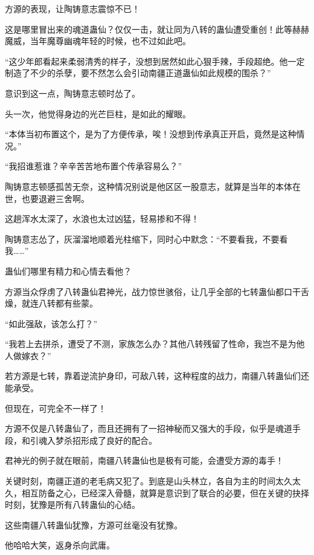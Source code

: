 
\begin{this_body}



方源的表现，让陶铸意志震惊不已！

这是哪里冒出来的魂道蛊仙？仅仅一击，就让同为八转的蛊仙遭受重创！此等赫赫魔威，当年魔尊幽魂年轻的时候，也不过如此吧。

“这少年郎看起来柔弱清秀的样子，没想到居然如此心狠手辣，手段超绝。他一定制造了不少的杀孽，要不然怎么会引动南疆正道蛊仙如此规模的围杀？”

意识到这一点，陶铸意志顿时怂了。

头一次，他觉得身边的光芒巨柱，是如此的耀眼。

“本体当初布置这个，是为了方便传承，唉！没想到传承真正开启，竟然是这种情况。”

“我招谁惹谁？辛辛苦苦地布置个传承容易么？”

陶铸意志顿感孤苦无奈，这种情况别说是他区区一股意志，就算是当年的本体在世，也要退避三舍啊。

这趟浑水太深了，水浪也太过凶猛，轻易掺和不得！

陶铸意志怂了，灰溜溜地顺着光柱缩下，同时心中默念：“不要看我，不要看我……”

蛊仙们哪里有精力和心情去看他？

方源当众俘虏了八转蛊仙君神光，战力惊世骇俗，让几乎全部的七转蛊仙都口干舌燥，就连八转都有些蒙。

“如此强敌，该怎么打？”

“我若上去拼杀，遭受了不测，家族怎么办？其他八转残留了性命，我岂不是为他人做嫁衣？”

若方源是七转，靠着逆流护身印，可敌八转，这种程度的战力，南疆八转蛊仙们还能承受。

但现在，可完全不一样了！

方源不仅是八转蛊仙了，而且还拥有了一招神秘而又强大的手段，似乎是魂道手段，和引魂入梦杀招形成了良好的配合。

君神光的例子就在眼前，南疆八转蛊仙也是极有可能，会遭受方源的毒手！

关键时刻，南疆正道的老毛病又犯了。到底是山头林立，各自为主的时间太久太久，相互防备之心，已经深入骨髓，就算是意识到了联合的必要，但在关键的抉择时刻，犹豫是所有八转蛊仙的心结。

这些南疆八转蛊仙犹豫，方源可丝毫没有犹豫。

他哈哈大笑，返身杀向武庸。


\end{this_body}

